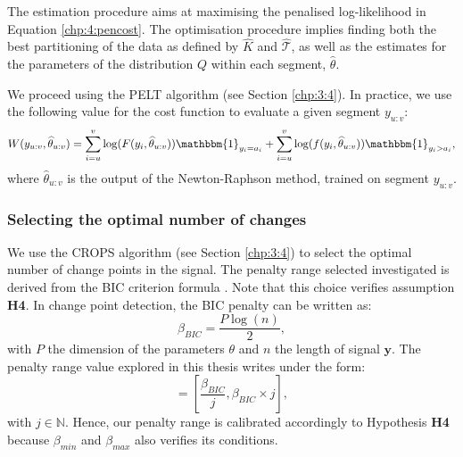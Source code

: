 The estimation procedure aims at maximising the penalised log-likelihood in Equation \ref{chp:4:pencost}. The optimisation procedure implies finding both the best partitioning of the data as defined by $\widehat{K}$ and $\widehat{\mathcal{T}}$, as well as the estimates for the parameters of the distribution $Q$ within each segment, $\widehat{\theta}$. 

We proceed using the PELT algorithm (see Section \ref{chp:3:4}). In practice, we use the following value for the cost function to evaluate a given segment $y_{u:v}$:
\begin{equation}
W(y_{u:v},\widehat{\theta}_{u:v}) = \sum_{i=u}^v\log(F(y_i,\widehat{\theta}_{u:v}))\mathbbm{1}_{y_i=a_i}+\sum_{i=u}^v\log(f(y_i,\widehat{\theta}_{u:v}))\mathbbm{1}_{y_i>a_i},
\end{equation} 
where $\widehat{\theta}_{u:v}$ is the output of the Newton-Raphson method, trained on segment $y_{u:v}$. 

\subsubsection{Selecting the optimal number of changes}

We use the CROPS algorithm (see Section \ref{chp:3:4}) to select the optimal number of change points in the signal. The penalty range selected investigated is derived from the BIC criterion formula \citep{YAO1988181}.  
Note that this choice verifies assumption \textbf{H4}. In change point detection, the BIC penalty can be written as: 
\begin{equation}
\beta_{BIC} = \frac{P\log(n)}{2},
\end{equation}
with $P$ the dimension of the parameters $\theta$ and $n$ the length of signal $\bm y$. The penalty range value explored in this thesis writes under the form: 
\begin{equation}
[\beta_{min},\beta_{max}] = [\frac{\beta_{BIC}}{j},\beta_{BIC}\times j],
\end{equation}
with $j\in\mathbb{N}$. Hence, our penalty range is calibrated accordingly to Hypothesis \textbf{H4} because $\beta_{min}$ and $\beta_{max}$ also verifies its conditions.  

